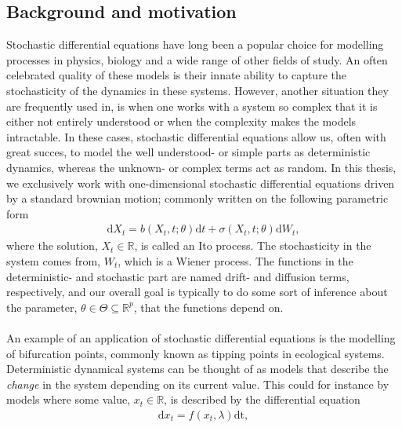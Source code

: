 \subsection{Background and motivation}
Stochastic differential equations have long been a popular choice for modelling processes in physics, biology and a wide range of other fields of study. An often celebrated quality of these models is their innate ability to capture the stochasticity of the dynamics in these systems. However, another situation they are frequently used in, is when one works with a system so complex that it is either not entirely understood or when the complexity makes the models intractable. In these cases, stochastic differential equations allow us, often with great succes, to model the well understood- or simple parts as deterministic dynamics, whereas the unknown- or complex terms act as random. In this thesis, we exclusively work with one-dimensional stochastic differential equations driven by a standard brownian motion; commonly written on the following parametric form
\begin{align}
    \mathrm{d}X_t = b(X_t, t;\theta)\mathrm{d}t + \sigma\left(X_t, t; \theta\right)\mathrm{d}W_t,
\end{align}
where the solution, $X_t\in\mathbb{R}$, is called an Ito process. The stochasticity in the system comes from, $W_t$, which is a Wiener process. The functions in the deterministic- and stochastic part are named drift- and diffusion terms, respectively, and our overall goal is typically to do some sort of inference about the parameter, $\theta\in\Theta\subseteq\mathbb{R}^p$, that the functions depend on. \\\\
An example of an application of stochastic differential equations is the modelling of bifurcation points, commonly known as tipping points in ecological systems. Deterministic dynamical systems can be thought of as models that describe the \textit{change} in the system depending on its current value. This could for instance by models where some value, $x_t\in\mathbb{R}$, is described by the differential equation
\begin{align}
    \mathrm{d}x_t = f(x_t, \lambda)\mathrm{dt},
\end{align}
